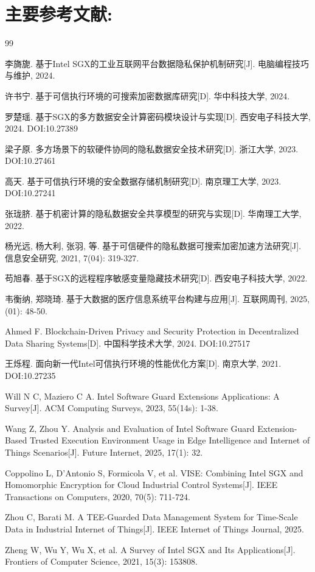 \documentclass{article}
\begin{document}
\newpage
\section{主要参考文献:}

\begin{thebibliography}{99}
\setlength{\itemsep}{0pt}
\setlength{\parskip}{0pt}

 李旖旎. 基于Intel SGX的工业互联网平台数据隐私保护机制研究[J]. 电脑编程技巧与维护, 2024.

 许书宁. 基于可信执行环境的可搜索加密数据库研究[D]. 华中科技大学, 2024.

 罗楚瑶. 基于SGX的多方数据安全计算密码模块设计与实现[D]. 西安电子科技大学, 2024. DOI:10.27389

 梁子原. 多方场景下的软硬件协同的隐私数据安全技术研究[D]. 浙江大学, 2023. DOI:10.27461

 高天. 基于可信执行环境的安全数据存储机制研究[D]. 南京理工大学, 2023. DOI:10.27241

 张珑脐. 基于机密计算的隐私数据安全共享模型的研究与实现[D]. 华南理工大学, 2022. 

 杨光远, 杨大利, 张羽, 等. 基于可信硬件的隐私数据可搜索加密加速方法研究[J]. 信息安全研究, 2021, 7(04): 319-327.

 苟旭春. 基于SGX的远程程序敏感变量隐藏技术研究[D]. 西安电子科技大学, 2022.

 韦衡纳, 郑晓琦. 基于大数据的医疗信息系统平台构建与应用[J]. 互联网周刊, 2025, (01): 48-50.

 Ahmed F. Blockchain-Driven Privacy and Security Protection in Decentralized Data Sharing Systems[D]. 中国科学技术大学, 2024. DOI:10.27517

 王烁程. 面向新一代Intel可信执行环境的性能优化方案[D]. 南京大学, 2021. DOI:10.27235

 Will N C, Maziero C A. Intel Software Guard Extensions Applications: A Survey[J]. ACM Computing Surveys, 2023, 55(14s): 1-38.

 Wang Z, Zhou Y. Analysis and Evaluation of Intel Software Guard Extension-Based Trusted Execution Environment Usage in Edge Intelligence and Internet of Things Scenarios[J]. Future Internet, 2025, 17(1): 32.

 Coppolino L, D'Antonio S, Formicola V, et al. VISE: Combining Intel SGX and Homomorphic Encryption for Cloud Industrial Control Systems[J]. IEEE Transactions on Computers, 2020, 70(5): 711-724.

 Zhou C, Barati M. A TEE-Guarded Data Management System for Time-Scale Data in Industrial Internet of Things[J]. IEEE Internet of Things Journal, 2025.

 Zheng W, Wu Y, Wu X, et al. A Survey of Intel SGX and Its Applications[J]. Frontiers of Computer Science, 2021, 15(3): 153808.

\end{thebibliography}
\end{document}
